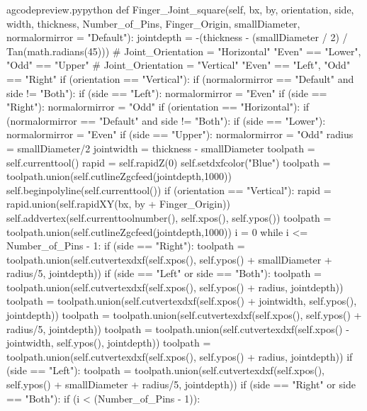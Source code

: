 \documentclass{ltxdoc}
\begin{document}
\begin{writecode}{a}{gcodepreview.py}{python}
    def Finger_Joint_square(self, bx, by, orientation, side, width, thickness, Number_of_Pins, Finger_Origin, smallDiameter, normalormirror = "Default"):
        jointdepth = -(thickness - (smallDiameter / 2) / Tan(math.radians(45)))
    # Joint_Orientation = "Horizontal" "Even" == "Lower", "Odd" == "Upper"
    # Joint_Orientation = "Vertical" "Even" == "Left", "Odd" == "Right"
        if (orientation == "Vertical"):
            if (normalormirror == "Default" and side != "Both"):
                if (side == "Left"):
                     normalormirror = "Even"
                if (side == "Right"):
                     normalormirror = "Odd"
        if (orientation == "Horizontal"):
            if (normalormirror == "Default" and side != "Both"):
                if (side == "Lower"):
                     normalormirror = "Even"
                if (side == "Upper"):
                     normalormirror = "Odd"
        radius = smallDiameter/2
        jointwidth = thickness - smallDiameter
        toolpath = self.currenttool()
        rapid = self.rapidZ(0)
        self.setdxfcolor("Blue")
        toolpath = toolpath.union(self.cutlineZgcfeed(jointdepth,1000))
        self.beginpolyline(self.currenttool())
        if (orientation == "Vertical"):
            rapid = rapid.union(self.rapidXY(bx, by + Finger_Origin))
            self.addvertex(self.currenttoolnumber(), self.xpos(), self.ypos())
            toolpath = toolpath.union(self.cutlineZgcfeed(jointdepth,1000))
            i = 0
            while i <= Number_of_Pins - 1:
                if (side == "Right"):
                    toolpath = toolpath.union(self.cutvertexdxf(self.xpos(), self.ypos() + smallDiameter + radius/5, jointdepth))
                if (side == "Left" or side == "Both"):
                    toolpath = toolpath.union(self.cutvertexdxf(self.xpos(), self.ypos() + radius, jointdepth))
                    toolpath = toolpath.union(self.cutvertexdxf(self.xpos() + jointwidth, self.ypos(), jointdepth))
                    toolpath = toolpath.union(self.cutvertexdxf(self.xpos(), self.ypos() + radius/5, jointdepth))
                    toolpath = toolpath.union(self.cutvertexdxf(self.xpos() - jointwidth, self.ypos(), jointdepth))
                    toolpath = toolpath.union(self.cutvertexdxf(self.xpos(), self.ypos() + radius, jointdepth))
                if (side == "Left"):
                    toolpath = toolpath.union(self.cutvertexdxf(self.xpos(), self.ypos() + smallDiameter + radius/5, jointdepth))
                if (side == "Right" or side == "Both"):
                    if (i < (Number_of_Pins - 1)):

\end{writecode}
\end{document}
